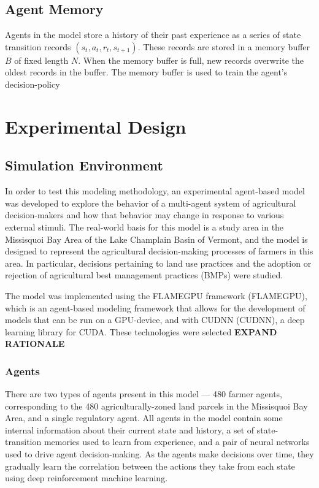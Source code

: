 \subsection{Agent Memory}
\label{subsec:farm_methods_memory}

Agents in the model store a history of their past experience as
a series of state transition records $(s_t,a_t,r_t,s_{t+1})$.
These records are stored in a memory buffer $B$ of fixed length $N$.
When the memory buffer is full, new records overwrite the oldest records in
the buffer.
The memory buffer is used to train the agent's decision-policy 

\section{Experimental Design}
\label{sec:farm_exp}

\subsection{Simulation Environment}
\label{subsec:farm_exp_env}

In order to test this modeling methodology,
an experimental agent-based model was developed to explore the behavior
of a multi-agent system of agricultural decision-makers
and how that behavior may change in response to various external stimuli.
The real-world basis for this model is a study area in the
Missisquoi Bay Area of the Lake Champlain Basin of Vermont,
and the model is designed to represent the agricultural decision-making
processes of farmers in this area.
In particular, decisions pertaining to land use practices and
the adoption or rejection of agricultural best management practices (BMPs)
were studied.

The model was implemented using the FLAMEGPU framework (FLAMEGPU),
which is an agent-based modeling framework that allows for the
development of models that can be run on a GPU-device,
and with CUDNN (CUDNN),
a deep learning library for CUDA.
These technologies were selected \textbf{EXPAND RATIONALE}

\subsubsection{Agents}
\label{subsubsec:farm_exp_agent}

There are two types of agents present in this model --- 480 farmer agents, 
corresponding to the 480 agriculturally-zoned land parcels in the Missisquoi 
Bay Area, 
and a single regulatory agent.
All agents in the model contain some internal information about their current 
state and history, a set of state-transition memories used to learn from 
experience, and a pair of neural networks used to drive agent decision-making. 
As the agents make decisions over time, they gradually learn the correlation 
between the actions they take from each state using deep reinforcement machine 
learning.


